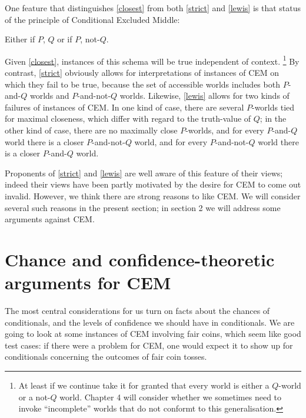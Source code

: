 \documentclass[If.tex]{subfiles}
\begin{document}
One feature that distinguishes \ref{closest} from both \ref{strict} and \ref{lewis} is
that status of the principle of Conditional Excluded Middle:
\begin{prop}
	\litem[CEM] \label{CEM}
	Either if $P$, $Q$ or if $P$, not-$Q$.
\end{prop}
Given \ref{closest}, instances of this schema will be true independent of context.%
\footnote{At least if we continue take it for granted that every world is either a $Q$-world or a not-$Q$ world.  Chapter 4 will consider whether we sometimes need to invoke “incomplete” worlds that do not conformt to this generalisation.} 
By contrast, \ref{strict} obviously allows for interpretations of instances of CEM on which they fail to be true, because the set of accessible worlds includes both $P$-and-$Q$ worlds and $P$-and-not-$Q$ worlds. Likewise, \ref{lewis} allows for two kinds of failures of instances of CEM. In one kind of case, there are several $P$-worlds tied for maximal closeness, which differ with regard to the truth-value of $Q$; in the other kind of case, there are no maximally close $P$-worlds, and for every $P$-and-$Q$ world there is a closer $P$-and-not-$Q$ world, and for every $P$-and-not-$Q$ world there is a closer $P$-and-$Q$ world.

Proponents of \ref{strict} and \ref{lewis} are well aware of this feature of their views; indeed their views have been partly motivated by the desire for CEM to come out invalid. However, we think there are strong reasons to like CEM. We will consider several such reasons in the present section; in section 2 we will address some arguments against CEM.

\section{Chance and confidence-theoretic arguments for CEM}
The most central considerations for us turn on facts about the chances of conditionals, and the levels of confidence we should have in conditionals. We are going to look at some instances of CEM involving fair coins, which seem like good test cases: if there were a problem for CEM, one would expect it to show up for conditionals concerning the outcomes of fair coin tosses.
\end{document}
